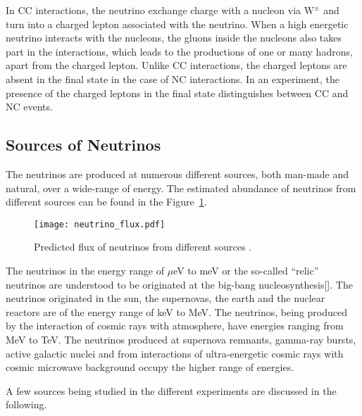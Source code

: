 In CC interactions, the neutrino exchange charge with a nucleon via
$\mathrm{W}^{\pm}$ and turn into a charged lepton associated with the
neutrino. When a high energetic neutrino interacts with the nucleons,
the gluons inside the nucleons also takes part in the interactions,
which leads to the productions of one or many hadrons, apart from the
charged lepton. Unlike CC interactions, the charged leptons are absent
in the final state in the case of NC interactions. In an experiment,
the presence of the charged leptons in the final state distinguishes
between CC and NC events.

\subsection{Sources of Neutrinos}
The neutrinos are produced at numerous different sources, both
\mbox{man-made} and natural, over a wide-range of energy. The
estimated abundance of neutrinos from different sources can be found
in the Figure~\ref{fig:neutrino_flux}. 
\begin{figure}[h]
  \centering
  \texttt{[image: neutrino\_flux.pdf]}
  \caption{Predicted flux of neutrinos from different sources
    \cite{neutrinoflux}.}
  \label{fig:neutrino_flux}
\end{figure}

The neutrinos in the energy range of $\mu$eV to meV or the so-called
``relic'' neutrinos are understood to be originated at the big-bang
nucleosynthesis[\cite{nucleosynthesis}]. The neutrinos originated in
the sun\cite{raydavis}, the supernovas, the
earth\cite{kamland,borexino} and the nuclear reactors are of the
energy range of keV to MeV. The neutrinos, being produced by the
interaction of cosmic rays with atmosphere, have energies ranging
from MeV to TeV. The neutrinos produced at supernova remnants,
gamma-ray bursts, active galactic nuclei and from interactions of
ultra-energetic cosmic rays with cosmic microwave background occupy
the higher range of energies.

A few sources being studied in the different experiments are discussed
in the following.

